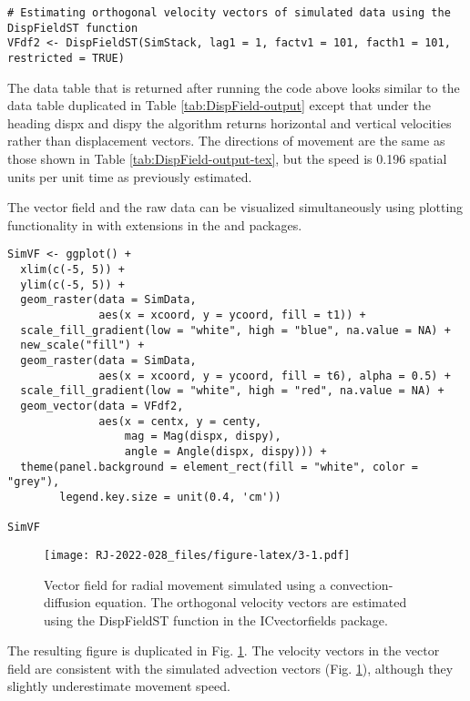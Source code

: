 \begin{verbatim}
# Estimating orthogonal velocity vectors of simulated data using the DispFieldST function
VFdf2 <- DispFieldST(SimStack, lag1 = 1, factv1 = 101, facth1 = 101, restricted = TRUE)
\end{verbatim}

The data table that is returned after running the code above looks similar to the data table duplicated in Table \ref{tab:DispField-output} except that under the heading dispx and dispy the algorithm returns horizontal and vertical velocities rather than displacement vectors. The directions of movement are the same as those shown in Table \ref{tab:DispField-output-tex}, but the speed is 0.196 spatial units per unit time as previously estimated.

The vector field and the raw data can be visualized simultaneously using plotting functionality in  with extensions in the  and  packages.

\begin{verbatim}
SimVF <- ggplot() +
  xlim(c(-5, 5)) +
  ylim(c(-5, 5)) +
  geom_raster(data = SimData,
              aes(x = xcoord, y = ycoord, fill = t1)) +
  scale_fill_gradient(low = "white", high = "blue", na.value = NA) +
  new_scale("fill") +
  geom_raster(data = SimData,
              aes(x = xcoord, y = ycoord, fill = t6), alpha = 0.5) +
  scale_fill_gradient(low = "white", high = "red", na.value = NA) +
  geom_vector(data = VFdf2, 
              aes(x = centx, y = centy, 
                  mag = Mag(dispx, dispy), 
                  angle = Angle(dispx, dispy))) + 
  theme(panel.background = element_rect(fill = "white", color = "grey"),
        legend.key.size = unit(0.4, 'cm'))

SimVF
\end{verbatim}

\begin{figure}
\centering
\texttt{[image: RJ-2022-028\_files/figure-latex/3-1.pdf]}
\caption{\label{fig:3}Vector field for radial movement simulated using a convection-diffusion equation. The orthogonal velocity vectors are estimated using the DispFieldST function in the ICvectorfields package.}
\end{figure}

The resulting figure is duplicated in Fig. \ref{fig:3}. The velocity vectors in the vector field are consistent with the simulated advection vectors (Fig. \ref{fig:3}), although they slightly underestimate movement speed.

